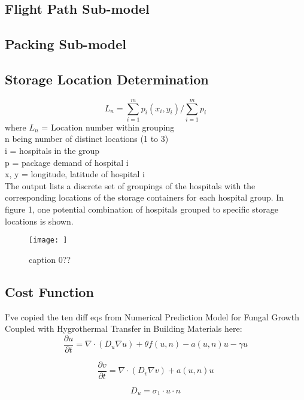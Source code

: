 \documentclass[12pt]{article}
\begin{document}
\begin{multicols}{2}
\subsection{Flight Path Sub-model}
\lipsum[3]

\subsection{Packing Sub-model}
\lipsum[4]

\subsection{Storage Location Determination}
\lipsum[5]
\[ 
L_n = \sum_{i=1}^{m} p_i(x_i, y_i) / \sum_{i=1}^{m} p_i 
\]
where $L_n$ = Location number within grouping \\
n being number of distinct locations (1 to 3) \\
i = hospitals in the group \\
p = package demand of hospital i \\
x, y = longitude, latitude of hospital i \\
The output lists a discrete set of groupings of the hospitals with the corresponding locations of the storage containers for each hospital group. In figure 1, one potential combination of hospitals grouped to specific storage locations is shown. 

\begin{figure}
	\centering
	\texttt{[image: ]}
	\caption[Fig 1]{caption 0??}
	\label{Fig 1}
\end{figure}


\subsection{Cost Function}
I've copied the ten diff eqs from Numerical Prediction Model for Fungal Growth Coupled with Hygrothermal Transfer in Building Materials here:
\begin{equation}
\frac{\partial{u}}{\partial{t}}=\nabla\cdot(D_u\nabla u)+\theta f(u,n)-a(u,n)u-\gamma u
\end{equation}

\begin{equation}
\frac{\partial{v}}{\partial{t}}=\nabla\cdot(D_v\nabla v)+a(u,n)u
\end{equation}

\begin{equation}
D_u=\sigma_{1}\cdot u\cdot n
\end{equation}


\end{multicols}
\end{document}
